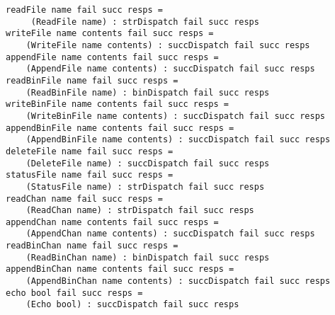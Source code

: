 \eprogB\noindent\bprogB
\mbox{\tt readFile\ name\ fail\ succ\ resps\ =}\\
\mbox{\tt \ \ \ \ \ (ReadFile\ name)\ :\ strDispatch\ fail\ succ\ resps}
\eprogB\noindent\bprogB
\mbox{\tt writeFile\ name\ contents\ fail\ succ\ resps\ =}\\
\mbox{\tt \ \ \ \ (WriteFile\ name\ contents)\ :\ succDispatch\ fail\ succ\ resps}
\eprogB\noindent\bprogB
\mbox{\tt appendFile\ name\ contents\ fail\ succ\ resps\ =}\\
\mbox{\tt \ \ \ \ (AppendFile\ name\ contents)\ :\ succDispatch\ fail\ succ\ resps}
\eprogB\noindent\bprogB
\mbox{\tt readBinFile\ name\ fail\ succ\ resps\ =}\\
\mbox{\tt \ \ \ \ (ReadBinFile\ name)\ :\ binDispatch\ fail\ succ\ resps}
\eprogB\noindent\bprogB
\mbox{\tt writeBinFile\ name\ contents\ fail\ succ\ resps\ =}\\
\mbox{\tt \ \ \ \ (WriteBinFile\ name\ contents)\ :\ succDispatch\ fail\ succ\ resps}
\eprogB\noindent\bprogB
\mbox{\tt appendBinFile\ name\ contents\ fail\ succ\ resps\ =}\\
\mbox{\tt \ \ \ \ (AppendBinFile\ name\ contents)\ :\ succDispatch\ fail\ succ\ resps}
\eprogB\noindent\bprogB
\mbox{\tt deleteFile\ name\ fail\ succ\ resps\ =}\\
\mbox{\tt \ \ \ \ (DeleteFile\ name)\ :\ succDispatch\ fail\ succ\ resps}
\eprogB\noindent\bprogB
\mbox{\tt statusFile\ name\ fail\ succ\ resps\ =}\\
\mbox{\tt \ \ \ \ (StatusFile\ name)\ :\ strDispatch\ fail\ succ\ resps}
\eprogB\noindent\bprogB
\mbox{\tt readChan\ name\ fail\ succ\ resps\ =}\\
\mbox{\tt \ \ \ \ (ReadChan\ name)\ :\ strDispatch\ fail\ succ\ resps}
\eprogB\noindent\bprogB
\mbox{\tt appendChan\ name\ contents\ fail\ succ\ resps\ =}\\
\mbox{\tt \ \ \ \ (AppendChan\ name\ contents)\ :\ succDispatch\ fail\ succ\ resps}
\eprogB\noindent\bprogB
\mbox{\tt readBinChan\ name\ fail\ succ\ resps\ =}\\
\mbox{\tt \ \ \ \ (ReadBinChan\ name)\ :\ binDispatch\ fail\ succ\ resps}
\eprogB\noindent\bprogB
\mbox{\tt appendBinChan\ name\ contents\ fail\ succ\ resps\ =}\\
\mbox{\tt \ \ \ \ (AppendBinChan\ name\ contents)\ :\ succDispatch\ fail\ succ\ resps}
\eprogB\noindent\bprogB
\mbox{\tt echo\ bool\ fail\ succ\ resps\ =}\\
\mbox{\tt \ \ \ \ (Echo\ bool)\ :\ succDispatch\ fail\ succ\ resps}
\eprogB\noindent\bprogB
